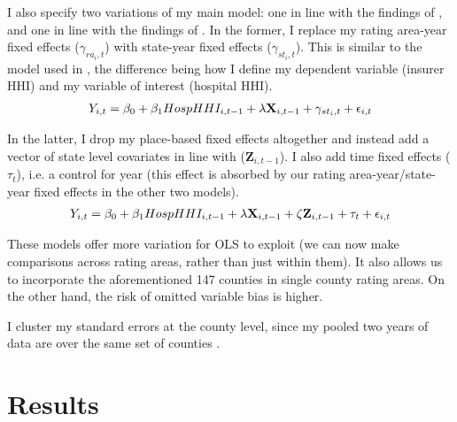 \documentclass[12pt,letterpaper]{article}
\begin{document}
I also specify two variations of my main model: one in line with the findings of \citet{boozary_association_2019}, and one in line with the findings of \citet{griffith_diminishing_2018}. In the former, I replace my rating area-year fixed effects ($\gamma_{ra_i, t}$) with state-year fixed effects ($\gamma_{st_i, t}$). This is similar to the model used in \citet{boozary_association_2019}, the difference being how I define my dependent variable (insurer HHI) and my variable of interest (hospital HHI).   
\\
\begingroup
{}
\vspace{-1.5cm}
\begin{equation}
\makebox[\textwidth]{%
$\begin{aligned}
Y_{i,t} = \beta_0 + \beta_1HospHHI_{i,t-1} +
\lambda\textbf{X}_{i,t-1} + \gamma_{st_i, t} + \epsilon_{i,t}  \notag \end{aligned}$}
\end{equation} 
\endgroup

In the latter, I drop my place-based fixed effects altogether and instead add a vector of state level covariates in line with \citet{griffith_diminishing_2018} ($\textbf{Z}_{i, t-1}$). I also add time fixed effects ($\tau_t$), i.e. a control for year (this effect is absorbed by our rating area-year/state-year fixed effects in the other two models).  
\\
\begingroup
{}
\vspace{-1.5cm}
\begin{equation}
\makebox[\textwidth]{%
$\begin{aligned}
Y_{i,t} = \beta_0 + \beta_1HospHHI_{i,t-1} +
\lambda\textbf{X}_{i,t-1} + \zeta\textbf{Z}_{i,t-1} + \tau_t + \epsilon_{i,t} \notag \end{aligned}$}
\end{equation} 
\endgroup

These models offer more variation for OLS to exploit (we can now make comparisons across rating areas, rather than just within them). It also allows us to incorporate the aforementioned 147 counties in single county rating areas. On the other hand, the risk of omitted variable bias is higher. 

I cluster my standard errors at the county level, since my pooled two years of data are over the same set of counties \citep{abadie_when_2017}.

\section{Results}
\end{document}
